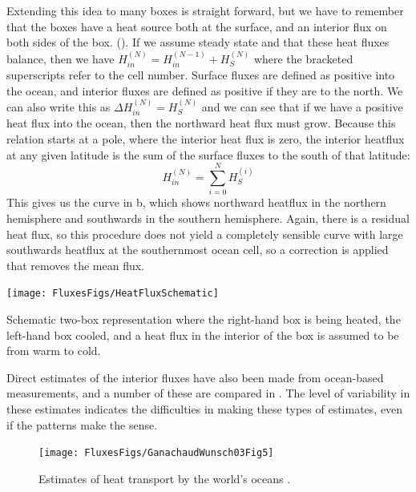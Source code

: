 Extending this idea to many boxes is straight forward, but we have to remember that the boxes have a heat source both at the surface, and an interior flux on both sides of the box.   (). If we assume steady state and that these heat fluxes balance, then we have $H_{in}^{(N)} = H_{in}^{(N-1)} + H_S^{(N)}$ where the bracketed superscripts refer to the cell number. Surface fluxes are defined as positive into the ocean, and interior fluxes are defined as positive if they are to the north.  We can also write this as $\Delta H_{in}^{(N)} = H_S^{(N)}$ and we can see that if we have a positive heat flux into the ocean, then the northward heat flux must grow.  Because this relation starts at a pole, where the interior heat flux is zero, the interior heatflux at any given latitude is the sum of the surface fluxes to the south of that latitude: 
\begin{equation}
    H_{in}^{(N)} = \sum_{i=0}^N H_{S}^{(i)}
\end{equation}
This gives us the curve in b, which shows northward heatflux in the northern hemisphere and southwards in the southern hemisphere.  Again, there is a residual heat flux, so this procedure does not yield a completely sensible curve with large southwards heatflux at the southernmost ocean cell, so a correction is applied that removes the mean flux.  

\begin{marginfigure}
\texttt{[image: FluxesFigs/HeatFluxSchematic]}
 \caption{Schematic two-box representation where the right-hand box is being heated, the left-hand box cooled, and a heat flux in the interior of the box is assumed to be from warm to cold.}
  \label{fig:HeatFluxSchematic}
\end{marginfigure}

Direct estimates of the interior fluxes have also been made from ocean-based measurements, and a number of these are compared in .  The level of variability in these estimates indicates the difficulties in making these types of estimates, even if the patterns make the sense.  

\begin{figure}
\begin{center}
\texttt{[image: FluxesFigs/GanachaudWunsch03Fig5]}
 \caption{Estimates of heat transport by the world's oceans \citep{ganachaudwunsch03}.}
  \label{fig:GanachaudWunsch03Fig5}
\end{center}
\end{figure}

